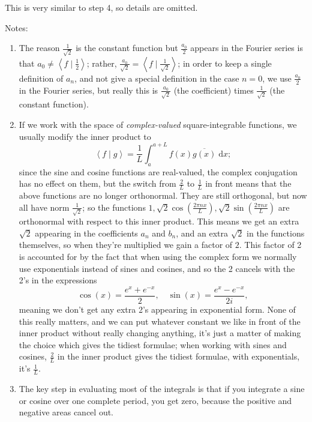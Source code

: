 \documentclass{article}
\newcommand{\diff}{\;\mathrm{d}}
\newcommand{\braket}[2]{\left\langle #1 \mid #2 \right\rangle}
\begin{document}
This is very similar to step 4, so details are omitted.\bigskip





Notes:

\begin{enumerate}
	\item The reason $\frac{1}{\sqrt{2}}$ is the constant function but $\frac{a_0}{2}$ appears in the Fourier series is that $a_0\neq \braket{f}{\frac{1}{2}}$; rather, $\frac{a_0}{\sqrt{2}}=\braket{f}{\frac{1}{\sqrt{2}}}$; in order to keep a single definition of $a_n$, and not give a special definition in the case $n=0$, we  use $\frac{a_0}{2}$ in the Fourier series, but really this is $\frac{a_0}{\sqrt{2}}$ (the coefficient) times $\frac{1}{\sqrt{2}}$ (the constant function).
	\item If we work with the space of \textit{complex-valued} square-integrable functions, we usually modify the inner product to
		\[\braket{f}{g}=\frac{1}{L}\int_a^{a+L}\!\!f(x)\overline{g(x)}\diff x;\]
		since the sine and cosine functions are real-valued, the complex conjugation has no effect on them, but the switch from $\frac{2}{L}$ to $\frac{1}{L}$ in front means that the above functions are no longer orthonormal. They are still orthogonal, but now all have norm $\frac{1}{\sqrt{2}}$; so the functions $1,\sqrt{2}\cos\left(\frac{2\pi nx}{L}\right),\sqrt{2}\sin\left(\frac{2\pi nx}{L}\right)$ are orthonormal with respect to this inner product. This means we get an extra $\sqrt{2}$ appearing in the coefficients $a_n$ and $b_n$, and an extra $\sqrt{2}$ in the functions themselves, so when they're multiplied we gain a factor of $2$. This factor of 2 is accounted for by the fact that when using the complex form we normally use exponentials instead of sines and cosines, and so the 2 cancels with the 2's in the expressions
		\[\cos(x)=\frac{e^x+e^{-x}}{2},\quad \sin(x)=\frac{e^x-e^{-x}}{2i},\]
		meaning we don't get any extra 2's appearing in exponential form. None of this really matters, and we can put whatever constant we like in front of the inner product without really changing anything, it's just a matter of making the choice which gives the tidiest formulae; when working with sines and cosines, $\frac{2}{L}$ in the inner product gives the tidiest formulae, with exponentials, it's $\frac{1}{L}$.
	\item The key step in evaluating most of the integrals is that if you integrate a sine or cosine over one complete period, you get zero, because the positive and negative areas cancel out.
\end{enumerate}
\end{document}
